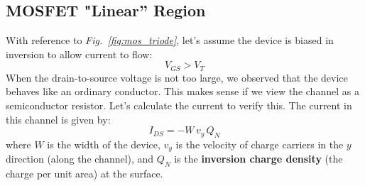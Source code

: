 \subsection{MOSFET "Linear'' Region}
With reference to \emph{Fig.~\ref{fig:mos_triode}}, let's assume the device is biased in inversion to allow current to flow:
    \begin{equation*}
        V_{GS} > V_{T}
    \end{equation*}
When the drain-to-source voltage is not too large, we observed that the device behaves like an ordinary conductor.  This makes sense if we view the channel as a semiconductor resistor.  Let's calculate the current to verify this.  The current in this channel is given by:
    \begin{equation}
        I_{DS} =  -W\,v_y\,Q_N
        \label{eq:mosfet_ids}
    \end{equation}
where $W$ is the width of the device, $v_y$ is the velocity of charge carriers in the $y$ direction (along the channel), and $Q_N$ is the \textbf{inversion charge density} (the charge per unit area) at the surface.  

